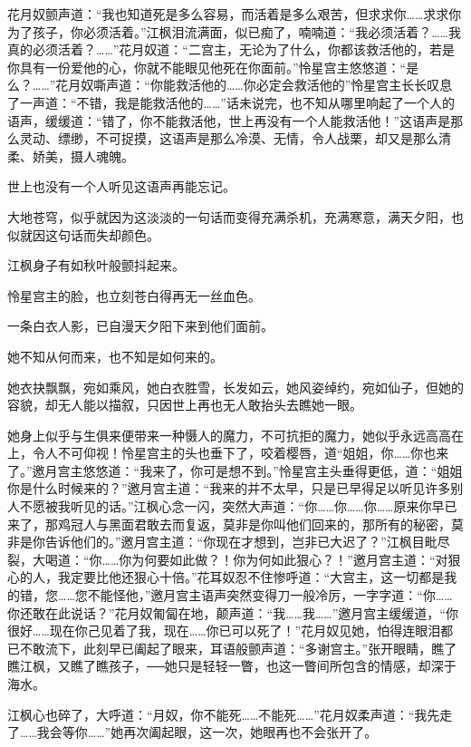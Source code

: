 \documentclass[12pt,oneside]{book}
\begin{document}
花月奴颤声道：``我也知道死是多么容易，而活着是多么艰苦，但求求你\ldots\ldots 求求你为了孩子，你必须活着。''江枫泪流满面，似已痴了，喃喃道：``我必须活着？\ldots\ldots 我真的必须活着？\ldots\ldots{}''花月奴道：``二宫主，无论为了什么，你都该救活他的，若是你具有一份爱他的心，你就不能眼见他死在你面前。''怜星宫主悠悠道：``是么？\ldots\ldots{}''花月奴嘶声道：``你能救活他的\ldots\ldots 你必定会救活他的''怜星宫主长长叹息了一声道：``不错，我是能救活他的\ldots\ldots{}''话未说完，也不知从哪里响起了一个人的语声，缓缓道：``错了，你不能救活他，世上再没有一个人能救活他！''这语声是那么灵动、缥缈，不可捉摸，这语声是那么冷漠、无情，令人战栗，却又是那么清柔、娇美，摄人魂魄。

世上也没有一个人听见这语声再能忘记。

大地苍穹，似乎就因为这淡淡的一句话而变得充满杀机，充满寒意，满天夕阳，也似就因这句话而失却颜色。

江枫身子有如秋叶般颤抖起来。

怜星宫主的脸，也立刻苍白得再无一丝血色。

一条白衣人影，已自漫天夕阳下来到他们面前。

她不知从何而来，也不知是如何来的。

她衣抉飘飘，宛如乘风，她白衣胜雪，长发如云，她风姿绰约，宛如仙子，但她的容貌，却无人能以描叙，只因世上再也无人敢抬头去瞧她一眼。

她身上似乎与生俱来便带来一种慑人的魔力，不可抗拒的魔力，她似乎永远高高在上，令人不可仰视！怜星宫主的头也垂下了，咬着樱唇，道``姐姐，你\ldots\ldots 你也来了。''邀月宫主悠悠道：``我来了，你可是想不到。''怜星宫主头垂得更低，道：``姐姐你是什么时候来的？''邀月宫主道：``我来的并不太早，只是已早得足以听见许多别人不愿被我听见的话。''江枫心念一闪，突然大声道：``你\ldots\ldots 你\ldots\ldots 你\ldots\ldots 原来你早已来了，那鸡冠人与黑面君敢去而复返，莫非是你叫他们回来的，那所有的秘密，莫非是你告诉他们的。''邀月宫主道：``你现在才想到，岂非已大迟了？''江枫目毗尽裂，大喝道：``你\ldots\ldots 你为何要如此做？！你为何如此狠心？！''邀月宫主道：``对狠心的人，我定要比他还狠心十倍。''花耳奴忍不住惨呼道：``大宫主，这一切都是我的错，您\ldots\ldots 您不能怪他，''邀月宫主语声突然变得刀一般冷厉，一字字道：``你\ldots\ldots 你还敢在此说话？''花月奴匍匐在地，颠声道：``我\ldots\ldots 我\ldots\ldots{}''邀月宫主缓缓道，``你很好\ldots\ldots 现在你己见着了我，现在\ldots\ldots 你已可以死了！''花月奴见她，怕得连眼泪都已不敢流下，此刻早已阖起了眼来，耳语般颤声道：``多谢宫主。''张开眼睛，瞧了瞧江枫，又瞧了瞧孩子，──她只是轻轻一瞥，也这一瞥间所包含的情感，却深于海水。

江枫心也碎了，大呼道：``月奴，你不能死\ldots\ldots 不能死\ldots\ldots{}''花月奴柔声道：``我先走了\ldots\ldots 我会等你\ldots\ldots{}''她再次阖起眼，这一次，她眼再也不会张开了。
\end{document}
